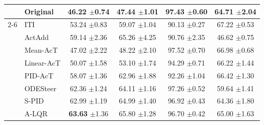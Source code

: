 \documentclass{article}
\theoremstyle{plain}
\theoremstyle{definition}
\theoremstyle{remark}
\begin{document}
\begin{table}[t]
{\begin{threeparttable}
\begin{tabular}{ll|>{\columncolor{lightblue}}ccc|c}
    \midrule
    

    & Original & 46.22 {\tiny $\pm$0.74} & 47.44 {\tiny $\pm$1.01} & 97.43 {\tiny $\pm$0.60} & 64.71 {\tiny $\pm$2.04} \\
    \cmidrule(lr){2-6}
    \multirow{7}{*}{\rotatebox{90}{Llama-3-8B}} 
    & ITI & 53.24 {\tiny $\pm$0.83} & 59.07 {\tiny $\pm$1.04} & 90.13 {\tiny $\pm$0.27} & 67.22 {\tiny $\pm$0.53} \\
    & ActAdd & 59.14 {\tiny $\pm$2.36} & 65.26 {\tiny $\pm$4.25} & 90.76 {\tiny $\pm$2.35} & 46.62 {\tiny $\pm$0.75} \\
    & Mean-AcT & 47.02 {\tiny $\pm$2.22} & 48.22 {\tiny $\pm$2.10} & 97.52 {\tiny $\pm$0.70} & 66.98 {\tiny $\pm$0.68} \\
    & Linear-AcT & 50.07 {\tiny $\pm$1.58} & 53.10 {\tiny $\pm$1.74} & 94.29 {\tiny $\pm$0.71} & 66.22 {\tiny $\pm$1.44} \\
    & PID-AcT & 58.07 {\tiny $\pm$1.36} & 62.96 {\tiny $\pm$1.88} & 92.26 {\tiny $\pm$1.04} & 66.42 {\tiny $\pm$1.30}\\
    & ODESteer & 62.36 {\tiny $\pm$1.24} & 64.11 {\tiny $\pm$1.16} & 97.26 {\tiny $\pm$0.52} & 59.64 {\tiny $\pm$1.41} \\
    & S-PID &  62.99 {\tiny $\pm$1.19} & 64.99 {\tiny $\pm$1.40} & 96.92 {\tiny $\pm$0.43} & 64.36 {\tiny $\pm$1.80} \\
    & A-LQR &  \textbf{63.63} {\tiny $\pm$1.36} & 65.80 {\tiny $\pm$1.28} & 96.70 {\tiny $\pm$0.42} & 65.00 {\tiny $\pm$1.63} \\

    \midrule


\end{tabular}
\end{threeparttable}}
\end{table}
\end{document}
